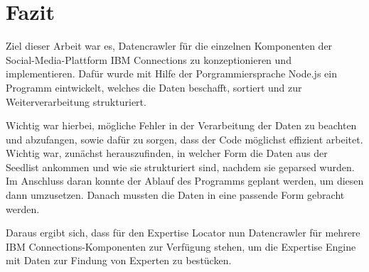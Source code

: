 
\chapter{Fazit}

Ziel dieser Arbeit war es, Datencrawler für die einzelnen Komponenten der Social-Media-Plattform IBM Connections zu konzeptionieren und implementieren. Dafür wurde mit Hilfe der Porgrammiersprache Node.js ein Programm eintwickelt, welches die Daten beschafft, sortiert und zur Weiterverarbeitung strukturiert. 

Wichtig war hierbei, mögliche Fehler in der Verarbeitung der Daten zu beachten und abzufangen, sowie dafür zu sorgen, dass der Code möglichst effizient arbeitet. \\
Wichtig war, zunächst herauszufinden, in welcher Form die Daten aus der Seedlist ankommen und wie sie strukturiert sind, nachdem sie geparsed wurden. Im Anschluss daran konnte der Ablauf des Programms geplant werden, um diesen dann umzusetzen. Danach mussten die Daten in eine passende Form gebracht werden.

Daraus ergibt sich, dass für den Expertise Locator nun Datencrawler für mehrere IBM Connections-Komponenten zur Verfügung stehen, um die Expertise Engine mit Daten zur Findung von Experten zu bestücken.